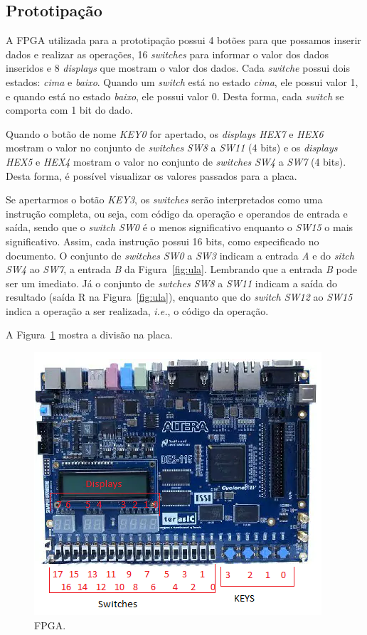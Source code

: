 \documentclass[11pt,a4paper,titlepage]{article}
\begin{document}
\subsection{Prototipação}\label{subsec:prot}

A FPGA utilizada para a prototipação possui 4 botões para que possamos inserir dados e realizar as operações, 16 \textit{switches} para informar o valor dos dados inseridos e 8 \textit{displays} que mostram o valor dos dados.
Cada \textit{switche} possui dois estados: \textit{cima} e \textit{baixo}.
Quando um \textit{switch} está no estado \textit{cima}, ele possui valor 1, e quando está no estado \textit{baixo}, ele possui valor 0.
Desta forma, cada \textit{switch} se comporta com 1 bit do dado.

Quando o botão de nome \textit{KEY0} for apertado, os \textit{displays HEX7} e \textit{HEX6} mostram o valor no conjunto de \textit{switches} \textit{SW8} a \textit{SW11} (4 bits) e os \textit{displays HEX5} e \textit{HEX4} mostram o valor no conjunto de \textit{switches} \textit{SW4} a \textit{SW7} (4 bits).
Desta forma, é possível visualizar os valores passados para a placa.

Se apertarmos o botão \textit{KEY3}, os \textit{switches} serão interpretados como uma instrução completa, ou seja, com código da operação e operandos de entrada e saída, sendo que o \textit{switch SW0} é o menos significativo enquanto o \textit{SW15} o mais significativo.
Assim, cada instrução possui 16 bits, como especificado no documento.
O conjunto de \textit{switches} \textit{SW0} a \textit{SW3} indicam a entrada \textit{A} e do \textit{sitch SW4} ao \textit{SW7}, a entrada \textit{B} da Figura~\ref{fig:ula}.
Lembrando que a entrada \textit{B} pode ser um imediato.
Já o conjunto de \textit{swtches SW8} a \textit{SW11} indicam a saída do resultado (saída R na Figura~\ref{fig:ula}), enquanto que do \textit{switch SW12} ao \textit{SW15} indica a operação a ser realizada, \textit{i.e.}, o código da operação.

A Figura~\ref{fig:fpga} mostra a divisão na placa.

\begin{figure}[h]
\centering
\includegraphics[]{images/fpga.png}
\caption{FPGA.}
\label{fig:fpga}
\end{figure}
\end{document}
